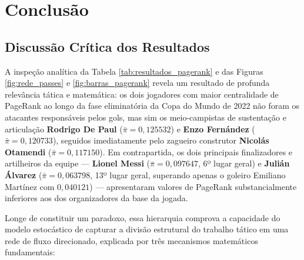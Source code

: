 \documentclass[10pt,a4paper]{article}
\theoremstyle{definition}
\theoremstyle{plain}
\theoremstyle{remark}
\begin{document}
\section{\sffamily Conclusão}

\subsection{\sffamily Discussão Crítica dos Resultados}

A inspeção analítica da Tabela \ref{tab:resultados_pagerank} e das Figuras \ref{fig:rede_passes} e \ref{fig:barras_pagerank} revela um resultado de profunda relevância tática e matemática: os dois jogadores com maior centralidade de PageRank ao longo da fase eliminatória da Copa do Mundo de 2022 não foram os atacantes responsáveis pelos gols, mas sim os meio-campistas de sustentação e articulação \textbf{Rodrigo De Paul} ($\bar{\pi} = 0{,}125532$) e \textbf{Enzo Fernández} ($\bar{\pi} = 0{,}120733$), seguidos imediatamente pelo zagueiro construtor \textbf{Nicolás Otamendi} ($\bar{\pi} = 0{,}117150$). Em contrapartida, os dois principais finalizadores e artilheiros da equipe --- \textbf{Lionel Messi} ($\bar{\pi} = 0{,}097647$, 6º lugar geral) e \textbf{Julián Álvarez} ($\bar{\pi} = 0{,}063798$, 13º lugar geral, superando apenas o goleiro Emiliano Martínez com $0{,}040121$) --- apresentaram valores de PageRank substancialmente inferiores aos dos organizadores da base da jogada.

Longe de constituir um paradoxo, essa hierarquia comprova a capacidade do modelo estocástico de capturar a divisão estrutural do trabalho tático em uma rede de fluxo direcionado, explicada por três mecanismos matemáticos fundamentais:
\end{document}

